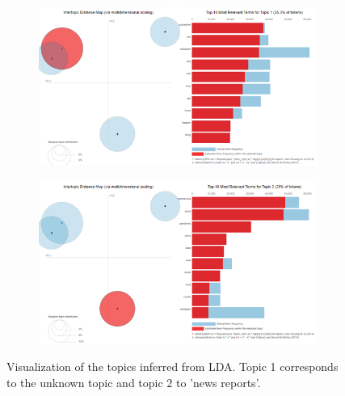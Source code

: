 \begin{figure}
 \centering
 \begin{subfigure}{0.75\columnwidth}
 \includegraphics[width=1\textwidth]{images/lda1.png}
 \end{subfigure}
 \centering
 \begin{subfigure}{0.75\columnwidth}
 \includegraphics[width=1\textwidth]{images/lda2.png}
 \end{subfigure}
 \caption{Visualization of the topics inferred from LDA. Topic 1 corresponds to the unknown topic and topic 2 to 'news reports'.}
 \label{fig:lda_viz}
\end{figure}



